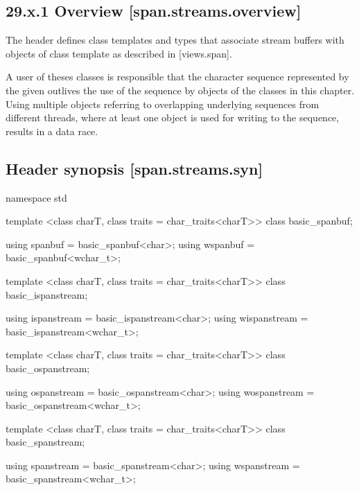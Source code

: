 \documentclass[ebook,11pt,article]{memoir}
\begin{document}
\subsection{29.x.1 Overview [span.streams.overview]}
The header  defines class templates and types that associate stream buffers with objects of class template  as described in [views.span]. 

\begin{note}
A user of theses classes is responsible that the character sequence represented by the given  outlives the use of the sequence by objects of the classes in this chapter. Using multiple  objects referring to overlapping underlying sequences from different threads, where at least one  object is used for writing to the sequence, results in a data race.
\end{note}

\subsection{Header  synopsis [span.streams.syn]}

\begin{codeblock}
namespace std {
  template <class charT, class traits = char_traits<charT>>
    class basic_spanbuf;
    
  using spanbuf = basic_spanbuf<char>;
  using wspanbuf = basic_spanbuf<wchar_t>;

  template <class charT, class traits = char_traits<charT>>
    class basic_ispanstream;

  using ispanstream = basic_ispanstream<char>;
  using wispanstream = basic_ispanstream<wchar_t>;

  template <class charT, class traits = char_traits<charT>>
    class basic_ospanstream;

  using ospanstream = basic_ospanstream<char>;
  using wospanstream = basic_ospanstream<wchar_t>;

  template <class charT, class traits = char_traits<charT>>
    class basic_spanstream;

  using spanstream = basic_spanstream<char>;
  using wspanstream = basic_spanstream<wchar_t>;
}
\end{codeblock}
\end{document}
